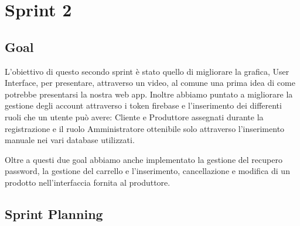 \hrulefill 
\section{Sprint 2}

\subsection{Goal}
L'obiettivo di questo secondo sprint è stato quello di migliorare la grafica, User Interface, per presentare, attraverso un video, al comune una prima idea di come potrebbe presentarsi la nostra web app.
Inoltre abbiamo puntato a migliorare la gestione degli account attraverso i token firebase e l'inserimento dei differenti ruoli che un utente può avere: Cliente e Produttore assegnati durante la registrazione e il ruolo Amministratore ottenibile solo attraverso l'inserimento manuale nei vari database utilizzati.

Oltre a questi due goal abbiamo anche implementato la gestione del recupero password, la gestione del carrello e l'inserimento, cancellazione e modifica di un prodotto nell'interfaccia fornita al produttore.

\subsection{Sprint Planning}


\vspace{-1cm}

